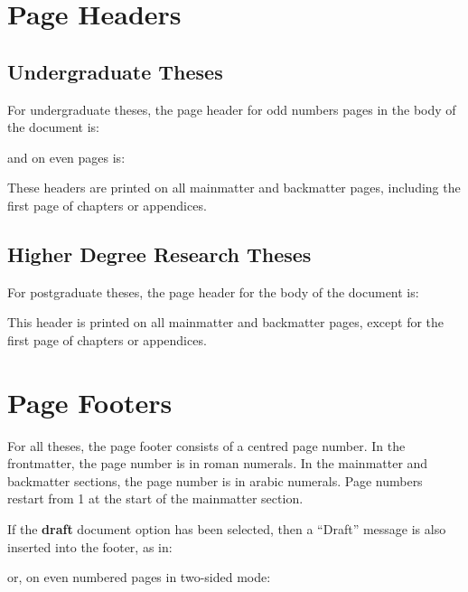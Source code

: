 \section{Page Headers}

\subsection{Undergraduate Theses}
For undergraduate theses, the page header for odd numbers pages in the
body of the document is:

\quad{}

and on even pages is:

\quad{}

These headers are printed on all mainmatter and backmatter pages,
including the first page of chapters or appendices.

\subsection{Higher Degree Research Theses}
For postgraduate theses, the page header for the body of the document is:

\quad{}

This header is printed on all mainmatter and backmatter pages,
except for the first page of chapters or appendices.

\section{Page Footers}

For all theses, the page footer consists of a centred page number.  
In the frontmatter, the page number is in roman numerals.  
In the mainmatter and backmatter sections, the page number is in arabic numerals.
Page numbers restart from 1 at the start of the mainmatter section.  

If the \textbf{draft} document option has been selected, then a ``Draft'' message is also inserted into the footer, as in:

\quad{}

or, on even numbered pages in two-sided mode:

\quad{}

